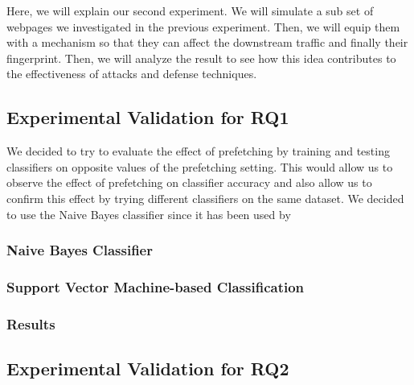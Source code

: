 Here, we will explain our second experiment. We will simulate a sub set of webpages we investigated in the previous experiment. Then, we will equip them with a mechanism so that they can affect the downstream traffic and finally their fingerprint. Then, we will analyze the result to see how this idea contributes to the effectiveness of attacks and defense techniques.

\subsection{Experimental Validation for RQ1}
We decided to try to evaluate the effect of prefetching by training and testing classifiers on opposite values of the prefetching setting. 
This would allow us to observe the effect of prefetching on classifier accuracy and also allow us to confirm this effect by trying different classifiers on the same dataset.
We decided to use the Naive Bayes classifier since it has been used by 

\subsubsection{Naive Bayes Classifier}

\subsubsection{Support Vector Machine-based Classification}

\subsubsection{Results}

\subsection{Experimental Validation for RQ2}

